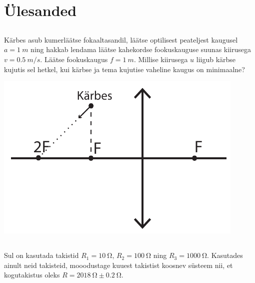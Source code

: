 \documentclass[10pt]{article}
\begin{document}
        \section{Ülesanded}
        \toggleStatement
        \subsection{\protect{}}

\graphicspath{{../probs_b3/}}


Kärbes asub kumerläätse fokaaltasandil, läätse optilisest peateljest kaugusel $a = \SI{1}{m}$ ning hakkab lendama läätse kahekordse fookuskauguse suunas kiirusega $v = \SI{0,5}{m/s}$. Läätse fookuskaugus $f = \SI{1}{m}$. Millise kiirusega $u$ liigub kärbse kujutis sel hetkel, kui kärbse ja tema kujutise vaheline kaugus on minimaalne?
\begin{center}
	\includegraphics[width = 0.5\linewidth]{2018-lahg-01-yl.pdf}
\end{center}
\probend
\bigskip
\newpage\subsection{\protect{}}


Sul on kasutada takistid $R_1=\SI{10}{\ohm}$, $R_2=\SI{100}{\ohm}$ ning $R_3=\SI{1000}{\ohm}$. Kasutades ainult neid takisteid, mooodustage kuuest takistist koosnev süsteem nii, et kogutakistus oleks $R=\SI{2018}{\ohm}\pm\SI{0,2}{\ohm}$.
\probend
\bigskip

\end{document}
